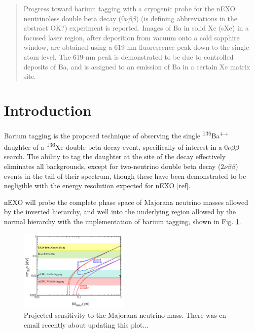 \documentclass[aps,pra,reprint,superscriptaddress]{revtex4-1}
\begin{document}
\date{\today}

\begin{abstract}
Progress toward barium tagging with a cryogenic probe for the nEXO neutrinoless double beta decay ($0\nu\beta\beta$)  {\color{red}(is defining abbreviations in the abstract OK?)} experiment is reported.  Images of Ba in solid Xe (sXe) in a focused laser region, after deposition from vacuum onto a cold sapphire window, are obtained using a 619-nm fluorescence peak down to the single-atom level.  The 619-nm peak is demonstrated to be due to controlled deposits of Ba, and is assigned to an emission of Ba in a certain Xe matrix site.

\end{abstract}


\maketitle %


\section{Introduction}

Barium tagging is the proposed technique of observing the single \textsuperscript{136}Ba\textsuperscript{++} daughter of a \textsuperscript{136}Xe double beta decay event, specifically of interest in a $0\nu\beta\beta$ search.  The ability to tag the daughter at the site of the decay effectively eliminates all backgrounds, except for two-neutrino double beta decay ($2\nu\beta\beta$) events in the tail of their spectrum, though these have been demonstrated to be negligible with the energy resolution expected for nEXO [ref]. 

nEXO will probe the complete phase space of Majorana neutrino masses allowed by the inverted hierarchy, and well into the underlying region allowed by the normal hierarchy with the implementation of barium tagging, shown in Fig. \ref{fig:nEXOsensitivity}.  

\begin{figure}
\includegraphics[width=0.48\textwidth]{figures/sensitivity.png}
\caption{Projected sensitivity to the Majorana neutrino mass.  {\color{red}There was en email recently about updating this plot...}}
\label{fig:nEXOsensitivity}
\end{figure}
\end{document}
